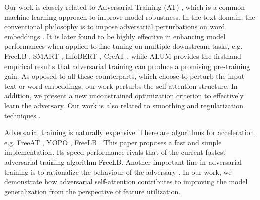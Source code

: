 \documentclass[letterpaper]{article} \usepackage{aaai23}  \usepackage{times}  \usepackage{helvet}  \usepackage{courier}  \usepackage[hyphens]{url}  \usepackage{graphicx} \urlstyle{rm} \def\UrlFont{\rm}  \usepackage{natbib}  \usepackage{caption} \frenchspacing  \setlength{\pdfpagewidth}{8.5in}  \setlength{\pdfpageheight}{11in}  \usepackage{algorithm}
\begin{document}
Our work is closely related to Adversarial Training (AT) \citep{DBLP:journals/corr/GoodfellowSS14}, which is a common machine learning approach to improve model robustness. In the text domain, the conventional philosophy is to impose adversarial perturbations on word embeddings \citep{DBLP:conf/iclr/MiyatoDG17}. It is later found to be highly effective in enhancing model performances when applied to fine-tuning on multiple downstream tasks, e.g. FreeLB \citep{DBLP:conf/iclr/ZhuCGSGL20}, SMART \citep{DBLP:conf/acl/JiangHCLGZ20}, InfoBERT \citep{DBLP:conf/iclr/WangWCGJLL21}, CreAT \citep{wu2023toward}, while ALUM \citep{DBLP:journals/corr/abs-2004-08994} provides the firsthand empirical results that adversarial training can produce a promising pre-training gain. As opposed to all these counterparts, which choose to perturb the input text or word embeddings, our work perturbs the self-attention structure. In addition, we present a new unconstrained optimization criterion to effectively learn the adversary. Our work is also related to smoothing and regularization techniques \citep{DBLP:journals/neco/Bishop95,DBLP:journals/jmlr/SrivastavaHKSS14}.

Adversarial training is naturally expensive. There are algorithms for acceleration, e.g. FreeAT \citep{DBLP:conf/nips/ShafahiNG0DSDTG19}, YOPO \citep{DBLP:conf/nips/ZhangZLZ019}, FreeLB \citep{DBLP:conf/iclr/ZhuCGSGL20}. This paper proposes a fast and simple implementation. Its speed performance rivals that of the current fastest adversarial training algorithm FreeLB. Another important line in adversarial training is to rationalize the behaviour of the adversary \citep{DBLP:conf/ijcai/SatoSS018}. In our work, we demonstrate how adversarial self-attention contributes to improving the model generalization from the perspective of feature utilization.
\end{document}
